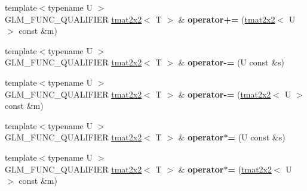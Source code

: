 \begin{DoxyCompactItemize}
\item 
\hypertarget{structglm_1_1detail_1_1tmat2x2_ad8f2e4617586dd78afebde4c3ff8def8}{}{\footnotesize template$<$typename U $>$ }\\G\+L\+M\+\_\+\+F\+U\+N\+C\+\_\+\+Q\+U\+A\+L\+I\+F\+I\+E\+R \hyperlink{structglm_1_1detail_1_1tmat2x2}{tmat2x2}$<$ T $>$ \& {\bfseries operator+=} (\hyperlink{structglm_1_1detail_1_1tmat2x2}{tmat2x2}$<$ U $>$ const \&m)\label{structglm_1_1detail_1_1tmat2x2_ad8f2e4617586dd78afebde4c3ff8def8}

\item 
\hypertarget{structglm_1_1detail_1_1tmat2x2_ab20e83c652d9c2b82bb543129b1e4347}{}{\footnotesize template$<$typename U $>$ }\\G\+L\+M\+\_\+\+F\+U\+N\+C\+\_\+\+Q\+U\+A\+L\+I\+F\+I\+E\+R \hyperlink{structglm_1_1detail_1_1tmat2x2}{tmat2x2}$<$ T $>$ \& {\bfseries operator-\/=} (U const \&s)\label{structglm_1_1detail_1_1tmat2x2_ab20e83c652d9c2b82bb543129b1e4347}

\item 
\hypertarget{structglm_1_1detail_1_1tmat2x2_aca7986f1e088343368506dba60a8533b}{}{\footnotesize template$<$typename U $>$ }\\G\+L\+M\+\_\+\+F\+U\+N\+C\+\_\+\+Q\+U\+A\+L\+I\+F\+I\+E\+R \hyperlink{structglm_1_1detail_1_1tmat2x2}{tmat2x2}$<$ T $>$ \& {\bfseries operator-\/=} (\hyperlink{structglm_1_1detail_1_1tmat2x2}{tmat2x2}$<$ U $>$ const \&m)\label{structglm_1_1detail_1_1tmat2x2_aca7986f1e088343368506dba60a8533b}

\item 
\hypertarget{structglm_1_1detail_1_1tmat2x2_afaaac2e6f990ac871b0e4aa01c08ed34}{}{\footnotesize template$<$typename U $>$ }\\G\+L\+M\+\_\+\+F\+U\+N\+C\+\_\+\+Q\+U\+A\+L\+I\+F\+I\+E\+R \hyperlink{structglm_1_1detail_1_1tmat2x2}{tmat2x2}$<$ T $>$ \& {\bfseries operator$\ast$=} (U const \&s)\label{structglm_1_1detail_1_1tmat2x2_afaaac2e6f990ac871b0e4aa01c08ed34}

\item 
\hypertarget{structglm_1_1detail_1_1tmat2x2_a2d9a4891fbdc71f886ecbb3374a6c13d}{}{\footnotesize template$<$typename U $>$ }\\G\+L\+M\+\_\+\+F\+U\+N\+C\+\_\+\+Q\+U\+A\+L\+I\+F\+I\+E\+R \hyperlink{structglm_1_1detail_1_1tmat2x2}{tmat2x2}$<$ T $>$ \& {\bfseries operator$\ast$=} (\hyperlink{structglm_1_1detail_1_1tmat2x2}{tmat2x2}$<$ U $>$ const \&m)\label{structglm_1_1detail_1_1tmat2x2_a2d9a4891fbdc71f886ecbb3374a6c13d}


\end{DoxyCompactItemize}

